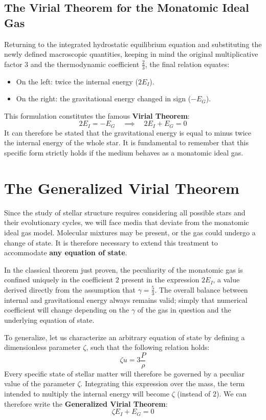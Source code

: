 \subsection{The Virial Theorem for the Monatomic Ideal Gas}
Returning to the integrated hydrostatic equilibrium equation and substituting the newly defined macroscopic quantities, keeping in mind the original multiplicative factor $3$ and the thermodynamic coefficient $\frac{2}{3}$, the final relation equates:
\begin{itemize}
\item On the left: twice the internal energy ($2 E_I$).
\item On the right: the gravitational energy changed in sign ($-E_G$).
\end{itemize}
This formulation constitutes the famous \textbf{Virial Theorem}:
\begin{equation}
2 E_I = - E_G \quad \implies \quad 2 E_I + E_G = 0
\end{equation}
It can therefore be stated that the gravitational energy is equal to minus twice the internal energy of the whole star. It is fundamental to remember that this specific form strictly holds if the medium behaves as a monatomic ideal gas.

\section{The Generalized Virial Theorem}

Since the study of stellar structure requires considering all possible stars and their evolutionary cycles, we will face media that deviate from the monatomic ideal gas model. Molecular mixtures may be present, or the gas could undergo a change of state. It is therefore necessary to extend this treatment to accommodate \textbf{any equation of state}.

In the classical theorem just proven, the peculiarity of the monatomic gas is confined uniquely in the coefficient $2$ present in the expression $2 E_I$, a value derived directly from the assumption that $\gamma = \frac{5}{3}$.
The overall balance between internal and gravitational energy always remains valid; simply that numerical coefficient will change depending on the $\gamma$ of the gas in question and the underlying equation of state.

To generalize, let us characterize an arbitrary equation of state by defining a dimensionless parameter $\zeta$, such that the following relation holds:
\begin{equation}
\zeta u = 3 \frac{P}{\rho}
\end{equation}
Every specific state of stellar matter will therefore be governed by a peculiar value of the parameter $\zeta$. Integrating this expression over the mass, the term intended to multiply the internal energy will become $\zeta$ (instead of $2$). We can therefore write the \textbf{Generalized Virial Theorem}:
\begin{equation}
\zeta E_I + E_G = 0
\end{equation}

